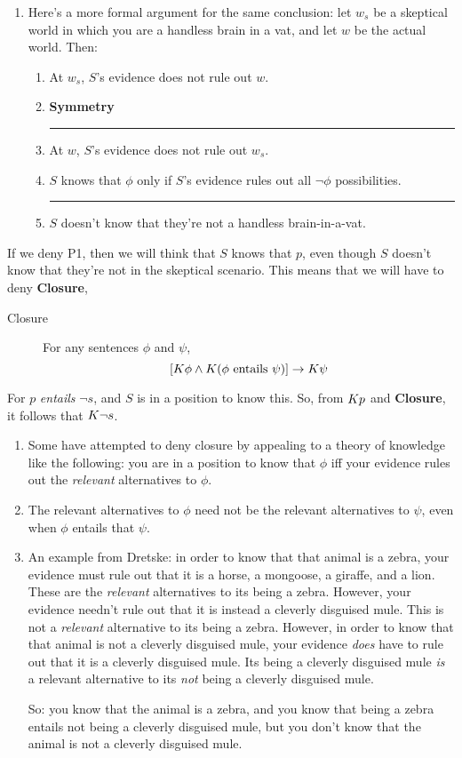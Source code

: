 \documentclass[landscape, two column, full page,reqno]{article}
\let\mathcal\relax
\newcommand{\mathcal}{\OMScal}%
\newcommand{\qe}{\begin{enumerate}}
\newcommand{\ze}{\end{enumerate}}
\newcommand{\p}{\item}
\newcommand{\e}{\emph}
\newcommand{\tbf}{\textbf}
\newcommand{\argu}[2]{\begin{center}\begin{minipage}{#1} \begin{enumerate}
	#2
\end{enumerate}
\end{minipage}  
\end{center}}
\newcommand{\thus}{

\vspace{5pt}

\hrule

\vspace{-3pt}

}
\newcommand{\K}{\mathcal{K}}
\begin{document}
	\qe
	\p Here's a more formal argument for the same conclusion: let $w_s$ be a skeptical world in which you are a handless brain in a vat, and let $w$ be the actual world.  Then:
	\argu{250pt}{
	\p[P6.] At $w_s$, $S$'s evidence does not rule out $w$.
	\p[P7.] \tbf{Symmetry}
	\thus
	\p[C3.] At $w$, $S$'s evidence does not rule out $w_s$.
	\p[P8.] $S$ knows that $\phi$ only if $S$'s evidence rules out all $\neg \phi$ possibilities.
	\thus
	\p[C4.] $S$ doesn't know that they're not a handless brain-in-a-vat.
	}
	\ze 

\p If we deny P1, then we will think that $S$ knows that $p$, even though $S$ doesn't know that they're not in the skeptical scenario.  This means that we will have to deny \tbf{Closure},
	\begin{description}
	\item[Closure] For any sentences $\phi$ and $\psi$, 
		\[
		[ \K \phi \wedge \K (\phi \text{ entails } \psi) ] \to  \K \psi
		\]
	\end{description}
For $p$ \e{entails} $\neg s$, and $S$ is in a position to know this.  So, from $\K p$ and \tbf{Closure}, it follows that $\K \neg s$.
	\qe
	\p Some have attempted to deny closure by appealing to a theory of knowledge like the following: you are in a position to know that $\phi$ iff your evidence rules out the \e{relevant} alternatives to $\phi$.
	\p The relevant alternatives to $\phi$ need not be the relevant alternatives to $\psi$, even when $\phi$ entails that $\psi$.
	\p An example from Dretske: in order to know that that animal is a zebra, your evidence must rule out that it is a horse, a mongoose, a giraffe, and a lion.  These are the \e{relevant} alternatives to its being a zebra.  However, your evidence needn't rule out that it is instead a cleverly disguised mule.  This is not a \e{relevant} alternative to its being a zebra.  However, in order to know that that animal is not a cleverly disguised mule, your evidence \e{does} have to rule out that it is a cleverly disguised mule.  Its being a cleverly disguised mule \e{is} a relevant alternative to its \e{not} being a cleverly disguised mule.
	
	So: you know that the animal is a zebra, and you know that being a zebra entails not being a cleverly disguised mule, but you don't know that the animal is not a cleverly disguised mule.

\ze 
	
\end{document}
